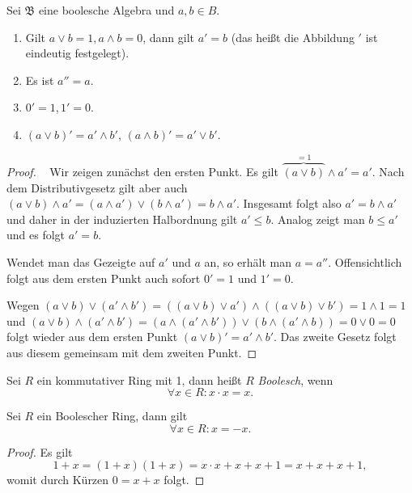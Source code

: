 \begin{lemma}
    Sei $\mathfrak{B}$ eine boolesche Algebra und $a,b \in B$.
    \begin{enumerate}
        \item Gilt $a \lor b = 1, a \land b = 0$, dann gilt $a' = b$ (das heißt die Abbildung $'$ ist eindeutig festgelegt).
        \item Es ist $a'' = a$.
        \item $0' = 1, 1' = 0$.
        \item $(a \lor b)' = a' \land b'$, $(a \land b)' = a' \lor b'$.
    \end{enumerate}
\end{lemma}
\begin{proof}{\ }
    Wir zeigen zunächst den ersten Punkt. Es gilt $\overbrace{(a\lor b)}^{=1}\land a'=a'$. Nach dem Distributivgesetz gilt aber auch $(a\lor b)\land a'=(a\land a')\lor (b\land a')=b\land a'$. Insgesamt folgt also $a'=b\land a'$ und daher in der induzierten Halbordnung gilt $a'\le b$. Analog zeigt man $b\leq a'$ und es folgt $a'=b$.

    Wendet man das Gezeigte auf $a'$ und $a$ an, so erhält man $a=a''$. Offensichtlich folgt aus dem ersten Punkt auch sofort $0'=1$ und $1'=0$.

    Wegen $(a\lor b)\lor (a'\land b')=((a\lor b)\lor a') \land ((a\lor b)\lor b')=1\land 1=1$ und $(a\lor b)\land (a'\land b')=(a\land (a'\land b'))\lor (b\land(a'\land b))=0\lor 0=0$ folgt wieder aus dem ersten Punkt $(a\lor b)'=a'\land b'$. Das zweite Gesetz folgt aus diesem gemeinsam mit dem zweiten Punkt.
\end{proof}


\begin{definition}
    Sei $R$ ein kommutativer Ring mit 1, dann heißt $R$ \emph{Boolesch}, wenn
    $$ \forall x \in R : x \cdot x = x. $$
\end{definition}

\begin{lemma}
    Sei $R$ ein Boolescher Ring, dann gilt
    $$ \forall x \in R : x = -x. $$
\end{lemma}

\begin{proof}
    Es gilt
    $$ 1 + x = (1+x)(1+x) = x \cdot x + x + x + 1 = x + x + x + 1, $$
    womit durch Kürzen $ 0 = x + x $ folgt.
\end{proof}

